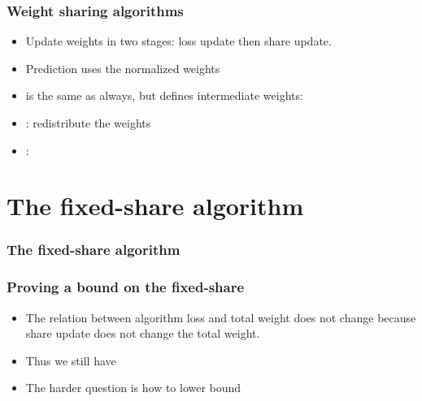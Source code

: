 \documentclass{beamer}
\begin{document}
\begin{frame}
\frametitle{Weight sharing algorithms}
\begin{itemize}
\item Update weights in two stages: loss update then share update.
\item Prediction uses the normalized  weights 
\item {} is the same as always, but defines intermediate  weights:
\R{\[
w_{t,i}^m = w_{t,i}^s e^{-\eta L(y_t,x_{t,i})}
\]}
\item {}: redistribute the weights
\item {}: 
\end{itemize}
\end{frame}

\section{The fixed-share algorithm}

\begin{frame}
\frametitle{The fixed-share algorithm}
\end{frame}

\begin{frame}
\frametitle{Proving a bound on the fixed-share}
\begin{itemize}
\item The relation between algorithm loss and total weight does not change
because share update does not change the total weight.
\item Thus we still have 
\R{\[
L_A \leq \frac{1}{\eta} \sum_{i=1}^n w_{l+1,i}^s
\]}
\item The harder question is how to lower bound 
\end{itemize}
\end{frame}
\end{document}
